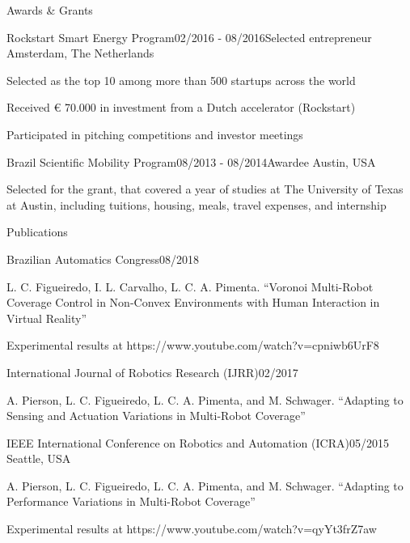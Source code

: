 \documentclass[14pt, a4paper]{resume} %
\begin{document}
\begin{rSection}{Awards \& Grants}

\begin{rSubsection}{Rockstart Smart Energy Program}{02/2016 - 08/2016}{Selected entrepreneur}{ \normalfont Amsterdam, The Netherlands}
	\item Selected as the top 10  among more than 500 startups across the world
	\item Received € 70.000 in investment from a Dutch accelerator (Rockstart)
	\item Participated in pitching competitions and investor meetings
\end{rSubsection}

\begin{rSubsection}{Brazil Scientific Mobility Program}{08/2013 - 08/2014}{Awardee}{ \normalfont Austin, USA}
	\item Selected for the grant, that covered a year of studies at The University of Texas at Austin, including tuitions, housing, meals, travel expenses, and internship
\end{rSubsection}

\end{rSection}

\begin{rSection}{Publications}
	
\begin{rSubsection}{Brazilian Automatics Congress}{08/2018}{}{}
	
\item L. C. Figueiredo, I. L. Carvalho, L. C. A. Pimenta. ``Voronoi Multi-Robot Coverage Control in Non-Convex Environments with Human Interaction in Virtual Reality''
\item Experimental results at https://www.youtube.com/watch?v=cpniwb6UrF8

\end{rSubsection}	
	
\begin{rSubsection}{International Journal of Robotics Research (IJRR)}{02/2017}{}{}
	
\item A. Pierson, L. C. Figueiredo, L. C. A. Pimenta, and M. Schwager. ``Adapting to Sensing and Actuation Variations in Multi-Robot Coverage''

\end{rSubsection}

\begin{rSubsection}{IEEE International Conference on Robotics and Automation (ICRA)}{05/2015}{}{ \normalfont Seattle, USA}

\item A. Pierson, L. C. Figueiredo, L. C. A. Pimenta, and M. Schwager. ``Adapting to Performance Variations in Multi-Robot Coverage''
\item Experimental results at https://www.youtube.com/watch?v=qyYt3frZ7aw


\end{rSubsection}


\end{rSection}
\end{document}
